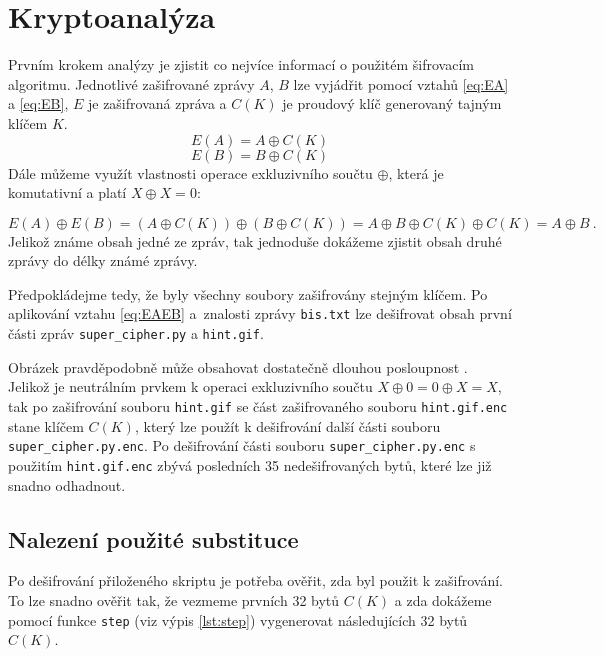 \documentclass[11pt,a4paper]{article}
\begin{document}
\section{Kryptoanalýza}
Prvním krokem analýzy je zjistit co nejvíce informací o použitém šifrovacím algoritmu. Jednotlivé zašifrované zprávy $A$, $B$ lze vyjádřit pomocí vztahů \ref{eq:EA} a \ref{eq:EB}, $E$ je zašifrovaná zpráva a $C(K)$ je proudový klíč generovaný tajným klíčem $K$.
\begin{equation}\label{eq:EA}
	E(A) = A \oplus C(K)
\end{equation}
\begin{equation}\label{eq:EB}
	E(B) = B \oplus C(K)
\end{equation}
Dále můžeme využít vlastnosti operace exkluzivního součtu $\oplus$, která je komutativní a platí $X\oplus X = 0$:

\begin{equation}\label{eq:EAEB}
	E(A) \oplus E(B) = (A \oplus C(K)) \oplus (B \oplus C(K)) =  A \oplus B \oplus C(K) \oplus C(K) = A \oplus B\ .
\end{equation}
Jelikož známe obsah jedné ze zpráv, tak jednoduše dokážeme zjistit obsah druhé zprávy do délky známé zprá\-vy. 

Předpokládejme tedy, že byly všechny soubory zašifrovány stejným klíčem. Po aplikování vztahu \ref{eq:EAEB} a~znalosti zprávy \texttt{bis.txt} lze dešifrovat obsah první části zpráv \texttt{super\_cipher.py} a \texttt{hint.gif}.

Obrázek pravděpodobně může obsahovat dostatečně dlouhou posloupnost . Jelikož  je neutrálním prvkem k operaci exkluzivního součtu $X\oplus 0 = 0 \oplus X = X$, tak po zašifrování souboru \texttt{hint.gif} se část zašifrovaného souboru \texttt{hint.gif.enc} stane klíčem $C(K)$, který lze použít k dešifrování další části souboru \texttt{super\_cipher.py.enc}. Po dešifrování části souboru \texttt{super\_cipher.py.enc} s použitím \texttt{hint.gif.enc} zbývá posledních 35 ne\-de\-šif\-rovaných bytů, které lze již snadno odhadnout.

\subsection{Nalezení použité substituce}

Po dešifrování přiloženého skriptu je potřeba ověřit, zda byl použit k zašifrování. To lze snadno ověřit tak, že vezmeme prvních 32 bytů $C(K)$ a zda dokážeme pomocí funkce \texttt{step} (viz výpis \ref{lst:step}) vygenerovat následujících 32 bytů $C(K)$. 
\end{document}
